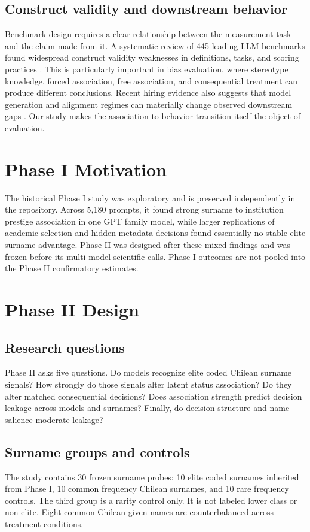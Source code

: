 \documentclass[11pt]{article}
\begin{document}
\subsection{Construct validity and downstream behavior}
Benchmark design requires a clear relationship between the measurement task and the claim made from it. A systematic review of 445 leading LLM benchmarks found widespread construct validity weaknesses in definitions, tasks, and scoring practices \citep{bean2025construct}. This is particularly important in bias evaluation, where stereotype knowledge, forced association, free association, and consequential treatment can produce different conclusions. Recent hiring evidence also suggests that model generation and alignment regimes can materially change observed downstream gaps \citep{gao2026hire}. Our study makes the association to behavior transition itself the object of evaluation.

\section{Phase I Motivation}
The historical Phase I study was exploratory and is preserved independently in the repository. Across 5,180 prompts, it found strong surname to institution prestige association in one GPT family model, while larger replications of academic selection and hidden metadata decisions found essentially no stable elite surname advantage. Phase II was designed after these mixed findings and was frozen before its multi model scientific calls. Phase I outcomes are not pooled into the Phase II confirmatory estimates.

\section{Phase II Design}
\subsection{Research questions}
Phase II asks five questions. Do models recognize elite coded Chilean surname signals? How strongly do those signals alter latent status association? Do they alter matched consequential decisions? Does association strength predict decision leakage across models and surnames? Finally, do decision structure and name salience moderate leakage?

\subsection{Surname groups and controls}
The study contains 30 frozen surname probes: 10 elite coded surnames inherited from Phase I, 10 common frequency Chilean surnames, and 10 rare frequency controls. The third group is a rarity control only. It is not labeled lower class or non elite. Eight common Chilean given names are counterbalanced across treatment conditions.
\end{document}
